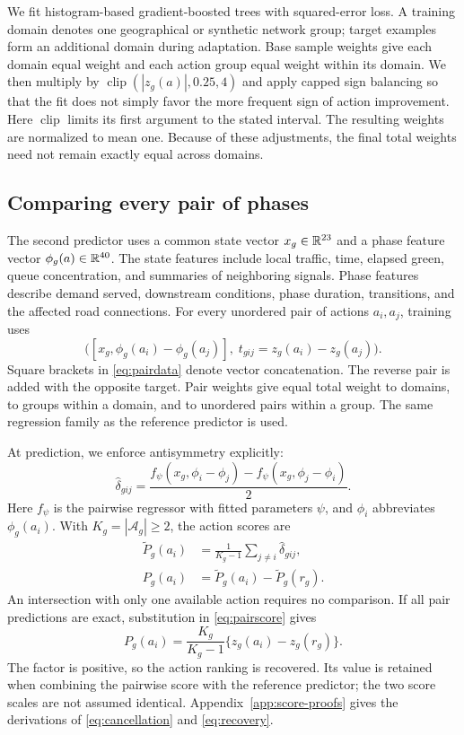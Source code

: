We fit histogram-based gradient-boosted trees with squared-error loss. A training domain denotes one geographical or synthetic network group; target examples form an additional domain during adaptation. Base sample weights give each domain equal weight and each action group equal weight within its domain. We then multiply by $\operatorname{clip}(|z_g(a)|,0.25,4)$ and apply capped sign balancing so that the fit does not simply favor the more frequent sign of action improvement. Here $\operatorname{clip}$ limits its first argument to the stated interval. The resulting weights are normalized to mean one. Because of these adjustments, the final total weights need not remain exactly equal across domains.

\subsection{Comparing every pair of phases}
The second predictor uses a common state vector $x_g\in\mathbb{R}^{23}$ and a phase feature vector $\phi_g(a)\in\mathbb{R}^{40}$. The state features include local traffic, time, elapsed green, queue concentration, and summaries of neighboring signals. Phase features describe demand served, downstream conditions, phase duration, transitions, and the affected road connections. For every unordered pair of actions $a_i,a_j$, training uses
\begin{equation}
 \bigl([x_g,\phi_g(a_i)-\phi_g(a_j)],\;
 t_{gij}=z_g(a_i)-z_g(a_j)\bigr).
 \label{eq:pairdata}
\end{equation}
Square brackets in \eqref{eq:pairdata} denote vector concatenation. The reverse pair is added with the opposite target. Pair weights give equal total weight to domains, to groups within a domain, and to unordered pairs within a group. The same regression family as the reference predictor is used.

At prediction, we enforce antisymmetry explicitly:
\begin{equation}
 \widehat\delta_{gij}=\frac{f_\psi(x_g,\phi_i-\phi_j)
 -f_\psi(x_g,\phi_j-\phi_i)}{2}.
 \label{eq:antisym}
\end{equation}
Here $f_\psi$ is the pairwise regressor with fitted parameters $\psi$, and $\phi_i$ abbreviates $\phi_g(a_i)$. With $K_g=|\mathcal A_g|\geq2$, the action scores are
\begin{align}
 \widetilde P_g(a_i)&=\frac{1}{K_g-1}\sum_{j\ne i}\widehat\delta_{gij},\nonumber\\
 P_g(a_i)&=\widetilde P_g(a_i)-\widetilde P_g(r_g).
 \label{eq:pairscore}
\end{align}
An intersection with only one available action requires no comparison. If all pair predictions are exact, substitution in \eqref{eq:pairscore} gives
\begin{equation}
 P_g(a_i)=\frac{K_g}{K_g-1}\{z_g(a_i)-z_g(r_g)\}.
 \label{eq:recovery}
\end{equation}
The factor is positive, so the action ranking is recovered. Its value is retained when combining the pairwise score with the reference predictor; the two score scales are not assumed identical.
Appendix~\ref{app:score-proofs} gives the derivations of \eqref{eq:cancellation} and \eqref{eq:recovery}.


